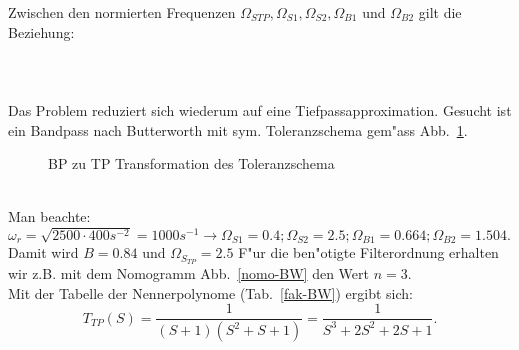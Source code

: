 \nit Zwischen den normierten Frequenzen $\Omega_{STP}, \Omega_{S1}, \Omega_{S2},
\Omega_{B1}$ und $\Omega_{B2}$ gilt die Beziehung:\\~~\\
\\~~\\
Das Problem reduziert sich wiederum auf eine Tiefpassapproximation.
\bsp{}
Gesucht ist ein Bandpass nach Butterworth mit sym. Toleranzschema gem"ass
Abb.~\ref{bsp-bp}.
\begin{figure}[!htb]
\begin{center}
  \caption{BP zu TP Transformation des Toleranzschema\label{bsp-bp}}
\end{center}
\vspace*{-6mm}
\end{figure}\\
\nit Man beachte: $\omega_{r}=\sqrt{2500\cdot 400 s^{-2}}=1000s^{-1}\longrightarrow\Omega_{S1}=0.4;\Omega_{S2}=2.5;\Omega_{B1}=0.664;\Omega_{B2}=1.504.$
\nit Damit wird $B=0.84$ und $\Omega_{S_{TP}}=2.5$ F"ur die ben"otigte
Filterordnung erhalten wir z.B. mit dem Nomogramm Abb.~\ref{nomo-BW} den Wert $n=3$.\\
Mit der Tabelle der Nennerpolynome (Tab.~\ref{fak-BW})
ergibt sich:
\[
T_{TP}(S)=\frac{1}{(S+1)(S^{2}+S+1)}=\frac{1}{S^{3}+2S^{2}+2S+1}.
\]
